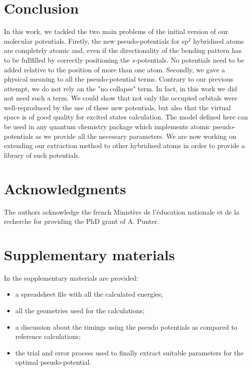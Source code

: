 \documentclass[aip,reprint]{revtex4-1}
\begin{document}
\section{Conclusion}
In this work, we tackled the two main problems of the initial version of our
molecular potentials.
Firstly, the new pseudo-potentials for sp$^2$ hybridised
atoms are completely atomic and, even if the directionality of the bonding pattern
has to be fullfilled by correctly positioning the \(s\)-potentials. No potentials need to
be added relative to the position of more than one atom.
Secondly, we gave a physical meaning to all the pseudo-potential
terms.
Contrary to our previous attempt, we do not rely on the "no collapse" term.
In fact, in this work we did not need such a term.
We could show that not only the occupied orbitals were well-reproduced
by the use of these new potentials, but also that the virtual space is of good quality
for excited states calculation.
The model defined here can be used in any quantum chemistry package which
implements atomic pseudo-potentials as we provide all the necessary parameters.
We are now working on extending our extraction method to other hybridised atoms
in order to provide a library of such potentials.

\section{Acknowledgments}
The authors acknowledge the french Minist\`ere de l'\'education
nationale et de la recherche for providing the PhD grant of A. Punter.

\section{Supplementary materials}
In the supplementary materials are provided:
\begin{itemize}
\item a spreadsheet file with all the calculated energies;
\item all the geometries used for the calculations;
\item a discussion about the timings using the pseudo potentials as compared to reference
calculations;
\item the trial and error process used to finally extract suitable parameters for
the optimal pseudo-potential.
\end{itemize}
\end{document}
